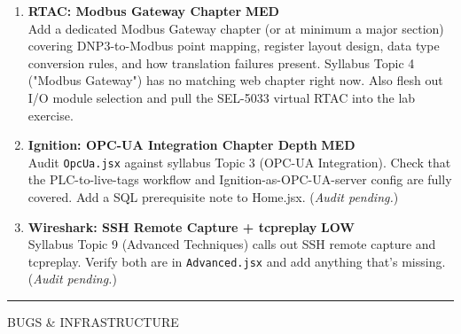 \documentclass[10pt]{article}
\newcommand{\med}{\textcolor{samber}{\small\bfseries MED}}
\newcommand{\low}{\textcolor{sgreen}{\small\bfseries LOW}}
\begin{document}
\begin{enumerate}[resume]
  \item \textbf{RTAC: Modbus Gateway Chapter} \hfill \med \\
    Add a dedicated Modbus Gateway chapter (or at minimum a major section) covering DNP3-to-Modbus point mapping, register layout design, data type conversion rules, and how translation failures present. Syllabus Topic 4 ("Modbus Gateway") has no matching web chapter right now. Also flesh out I/O module selection and pull the SEL-5033 virtual RTAC into the lab exercise.

  \item \textbf{Ignition: OPC-UA Integration Chapter Depth} \hfill \med \\
    Audit \texttt{OpcUa.jsx} against syllabus Topic 3 (OPC-UA Integration). Check that the PLC-to-live-tags workflow and Ignition-as-OPC-UA-server config are fully covered. Add a SQL prerequisite note to Home.jsx. (\emph{Audit pending.})

  \item \textbf{Wireshark: SSH Remote Capture + tcpreplay} \hfill \low \\
    Syllabus Topic 9 (Advanced Techniques) calls out SSH remote capture and tcpreplay. Verify both are in \texttt{Advanced.jsx} and add anything that's missing. (\emph{Audit pending.})
\end{enumerate}

\smallskip
{\color{snavy}\rule{\linewidth}{0.4pt}}
\smallskip

{\small\sffamily\color{sgray}\MakeUppercase{Bugs \& Infrastructure}}
\smallskip
\end{document}
